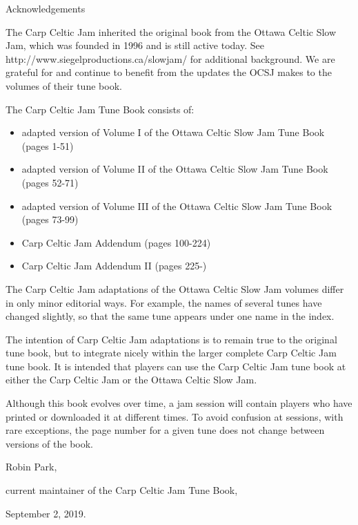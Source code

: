 \documentclass[10pt,fleqn]{article}
\begin{document}
\pagestyle{empty}
\setlength{\parindent}{0pt}
\setlength{\parskip}{1em}
\begin{center}
\LARGE
Acknowledgements
\normalsize
\end{center}

The Carp Celtic Jam inherited the original book from the Ottawa Celtic Slow Jam, which was founded in 1996 and is still active today.  See http://www.siegelproductions.ca/slowjam/ for additional background.  We are grateful for and continue to benefit from the updates the OCSJ makes to the volumes of their tune book.

The Carp Celtic Jam Tune Book consists of:
\begin{itemize}
\item adapted version of Volume I of the Ottawa Celtic Slow Jam Tune Book (pages 1-51)
\item adapted version of Volume II of the Ottawa Celtic Slow Jam Tune Book (pages 52-71)
\item adapted version of Volume III of the Ottawa Celtic Slow Jam Tune Book (pages 73-99)
\item Carp Celtic Jam Addendum (pages 100-224)
\item Carp Celtic Jam Addendum II (pages 225-)
\end{itemize}

The Carp Celtic Jam adaptations of the Ottawa Celtic Slow Jam volumes differ in only minor editorial ways.  For example, the names of several tunes have changed slightly, so that the same tune appears under one name in the index.

The intention of Carp Celtic Jam adaptations is to remain true to the original tune book, but to integrate nicely within the larger complete Carp Celtic Jam tune book.  It is intended that players can use the Carp Celtic Jam tune book at either the Carp Celtic Jam or the Ottawa Celtic Slow Jam.

Although this book evolves over time, a jam session will contain players who have printed or downloaded it at different times.  To avoid confusion at sessions, with rare exceptions, the page number for a given tune does not change between versions of the book.

\begin{flushright}
\setlength{\parskip}{0pt}
Robin Park,

current maintainer of the Carp Celtic Jam Tune Book,

September 2, 2019.
\end{flushright}
\end{document}
